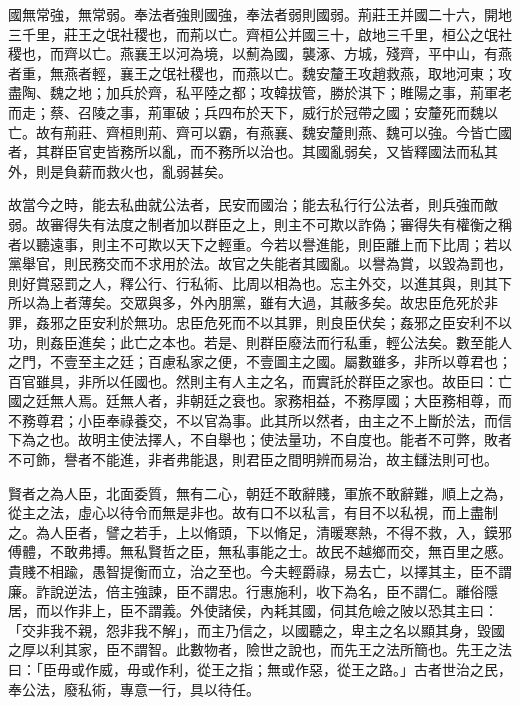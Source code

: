 
\begin{pinyinscope}
國無常強，無常弱。奉法者強則國強，奉法者弱則國弱。荊莊王并國二十六，開地三千里，莊王之氓社稷也，而荊以亡。齊桓公并國三十，啟地三千里，桓公之氓社稷也，而齊以亡。燕襄王以河為境，以薊為國，襲涿、方城，殘齊，平中山，有燕者重，無燕者輕，襄王之氓社稷也，而燕以亡。魏安釐王攻趙救燕，取地河東；攻盡陶、魏之地；加兵於齊，私平陸之都；攻韓拔管，勝於淇下；睢陽之事，荊軍老而走；蔡、召陵之事，荊軍破；兵四布於天下，威行於冠帶之國；安釐死而魏以亡。故有荊莊、齊桓則荊、齊可以霸，有燕襄、魏安釐則燕、魏可以強。今皆亡國者，其群臣官吏皆務所以亂，而不務所以治也。其國亂弱矣，又皆釋國法而私其外，則是負薪而救火也，亂弱甚矣。

故當今之時，能去私曲就公法者，民安而國治；能去私行行公法者，則兵強而敵弱。故審得失有法度之制者加以群臣之上，則主不可欺以詐偽；審得失有權衡之稱者以聽遠事，則主不可欺以天下之輕重。今若以譽進能，則臣離上而下比周；若以黨舉官，則民務交而不求用於法。故官之失能者其國亂。以譽為賞，以毀為罰也，則好賞惡罰之人，釋公行、行私術、比周以相為也。忘主外交，以進其與，則其下所以為上者薄矣。交眾與多，外內朋黨，雖有大過，其蔽多矣。故忠臣危死於非罪，姦邪之臣安利於無功。忠臣危死而不以其罪，則良臣伏矣；姦邪之臣安利不以功，則姦臣進矣；此亡之本也。若是、則群臣廢法而行私重，輕公法矣。數至能人之門，不壹至主之廷；百慮私家之便，不壹圖主之國。屬數雖多，非所以尊君也；百官雖具，非所以任國也。然則主有人主之名，而實託於群臣之家也。故臣曰：亡國之廷無人焉。廷無人者，非朝廷之衰也。家務相益，不務厚國；大臣務相尊，而不務尊君；小臣奉祿養交，不以官為事。此其所以然者，由主之不上斷於法，而信下為之也。故明主使法擇人，不自舉也；使法量功，不自度也。能者不可弊，敗者不可飾，譽者不能進，非者弗能退，則君臣之間明辨而易治，故主讎法則可也。

賢者之為人臣，北面委質，無有二心，朝廷不敢辭賤，軍旅不敢辭難，順上之為，從主之法，虛心以待令而無是非也。故有口不以私言，有目不以私視，而上盡制之。為人臣者，譬之若手，上以脩頭，下以脩足，清暖寒熱，不得不救，入，鏌邪傅體，不敢弗搏。無私賢哲之臣，無私事能之士。故民不越鄉而交，無百里之慼。貴賤不相踰，愚智提衡而立，治之至也。今夫輕爵祿，易去亡，以擇其主，臣不謂廉。詐說逆法，倍主強諫，臣不謂忠。行惠施利，收下為名，臣不謂仁。離俗隱居，而以作非上，臣不謂義。外使諸侯，內耗其國，伺其危嶮之陂以恐其主曰：「交非我不親，怨非我不解」，而主乃信之，以國聽之，卑主之名以顯其身，毀國之厚以利其家，臣不謂智。此數物者，險世之說也，而先王之法所簡也。先王之法曰：「臣毋或作威，毋或作利，從王之指；無或作惡，從王之路。」古者世治之民，奉公法，廢私術，專意一行，具以待任。


\end{pinyinscope}
